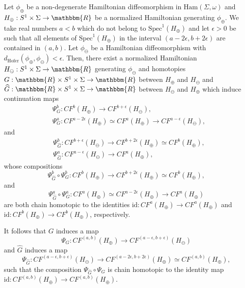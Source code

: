 \documentclass[AHL,Unicode,longabstracts,published]{cedram}
\newcommand{\R}{\mathbbm{R}}
\newcommand{\Ham}{\mathrm{Ham}}
\newcommand{\hofer}{\mathrm{Hofer}}
\newcommand{\Spec}{\mathrm{Spec}}
\newcommand{\rid}{\mathrm{id}}
\newcommand{\hofer}{\mathrm{Hofer}}
\begin{document}
\begin{prop}\label{prop:actionwindowsclosedsurface}
Let $\phi_\oplus$ be a non-degenerate Hamiltonian diffeomorphism in \linebreak $\Ham(\Sigma,\omega)$ and $H_\oplus:S^1 \times \Sigma \to \R$ be a normalized Hamiltonian generating $\phi_\oplus$. We take real numbers $a<b$ which do not belong to $\Spec^1(H_\oplus)$ and let $\epsilon>0$ be such that all elements of $\Spec^1(H_\oplus)$ in the interval $(a-2\epsilon, b+2\epsilon)$ are contained in $(a,b)$. Let $\phi_\ominus$ be a Hamiltonian diffeomorphism with $d_{\hofer}(\phi_\oplus, \phi_\ominus)< \epsilon$. Then, there exist a normalized Hamiltonian $H_\ominus :S^1 \times \Sigma \to \R $ generating $\phi_\ominus$ and homotopies $G: \R \times S^1 \times \Sigma \to \R $ between $H_\oplus$ and $H_\ominus$ and $\widehat{G}: \R \times S^1 \times \Sigma \to \R $ between $H_\ominus$ and $H_\oplus$ which induce continuation maps
\begin{align*}
& \Psi_G^b: CF^{b}(H_\oplus) \to CF^{b+\epsilon}(H_\ominus), \\ & \Psi_G^a: CF^{a - 2\epsilon}(H_\oplus) \simeq CF^{a }(H_\oplus) \to CF^{a-\epsilon}(H_\ominus),
\end{align*}
and
\begin{align*}
& \Psi_{\widehat{G}}^b: CF^{b+ \epsilon}(H_\ominus) \to CF^{b+2\epsilon}(H_\oplus) \simeq CF^{b}(H_\oplus), \\ & \Psi_{\widehat{G}}^a: CF^{a-\epsilon }(H_\ominus) \to CF^{a}(H_\oplus),
\end{align*}
whose compositions
\[
\Psi_{\widehat{G}}^b\circ \Psi_G^b: CF^{b}(H_\oplus) \to CF^{b+ 2\epsilon}(H_\oplus) \simeq CF^{b }(H_\oplus),
\]
and
\[
\Psi_{\widehat{G}}^a\circ \Psi_G^a: CF^{a}(H_\oplus) \simeq CF^{a - 2\epsilon}(H_\oplus) \to CF^{a}(H_\oplus)
\]
are both chain homotopic to the identities ${\rid}: CF^{a}(H_\oplus) \to CF^{a}(H_\oplus) $ and ${\rid}: CF^{b}(H_\oplus) \to CF^{b}(H_\oplus) $, respectively.

It follows that $G$ induces a map
\[
\Psi_G: CF^{(a,b)}(H_\oplus) \to CF^{(a-\epsilon, b+\epsilon)}(H_\ominus)
\]
and $\widehat{G}$ induces a map
\[
\Psi_{\widehat{G}}: CF^{(a-\epsilon, b+\epsilon)}(H_\ominus) \to CF^{(a-2\epsilon,b+2\epsilon)}(H_\oplus) \simeq CF^{(a,b)}(H_\oplus),
\]
such that the composition $\Psi_{\widehat{G}}\circ \Psi_G$ is chain homotopic to the identity map ${\rid}: CF^{(a,b)}(H_\oplus) \to CF^{(a,b)}(H_\oplus) $.
\end{prop}
\end{document}
